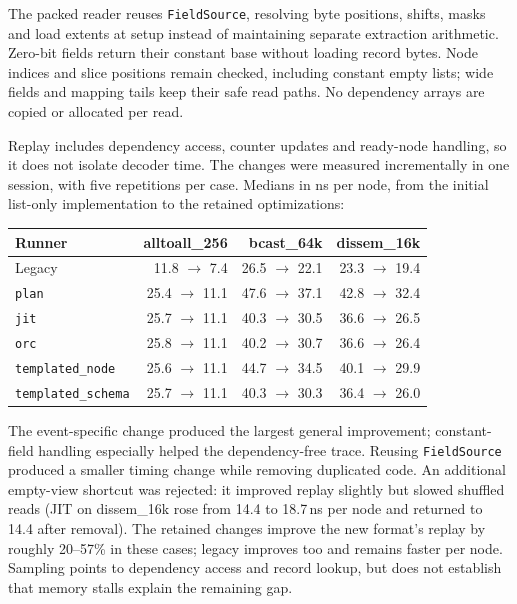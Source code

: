 \documentclass[10pt,a4paper]{article}
\begin{document}
The packed reader reuses \texttt{FieldSource}, resolving byte positions, shifts, masks and load extents at setup instead of maintaining separate extraction arithmetic. Zero-bit fields return their constant base without loading record bytes. Node indices and slice positions remain checked, including constant empty lists; wide fields and mapping tails keep their safe read paths. No dependency arrays are copied or allocated per read.

Replay includes dependency access, counter updates and ready-node handling, so it does not isolate decoder time. The changes were measured incrementally in one session, with five repetitions per case. Medians in ns per node, from the initial list-only implementation to the retained optimizations:

\begin{center}
\small
\begin{tabular}{lrrr}
\toprule
\textbf{Runner} & \textbf{alltoall\_256} & \textbf{bcast\_64k} & \textbf{dissem\_16k} \\
\midrule
Legacy & 11.8 \(\rightarrow\) 7.4 & 26.5 \(\rightarrow\) 22.1 & 23.3 \(\rightarrow\) 19.4 \\
\texttt{plan} & 25.4 \(\rightarrow\) 11.1 & 47.6 \(\rightarrow\) 37.1 & 42.8 \(\rightarrow\) 32.4 \\
\texttt{jit} & 25.7 \(\rightarrow\) 11.1 & 40.3 \(\rightarrow\) 30.5 & 36.6 \(\rightarrow\) 26.5 \\
\texttt{orc} & 25.8 \(\rightarrow\) 11.1 & 40.2 \(\rightarrow\) 30.7 & 36.6 \(\rightarrow\) 26.4 \\
\texttt{templated\_node} & 25.6 \(\rightarrow\) 11.1 & 44.7 \(\rightarrow\) 34.5 & 40.1 \(\rightarrow\) 29.9 \\
\texttt{templated\_schema} & 25.7 \(\rightarrow\) 11.1 & 40.3 \(\rightarrow\) 30.3 & 36.4 \(\rightarrow\) 26.0 \\
\bottomrule
\end{tabular}
\end{center}

The event-specific change produced the largest general improvement; constant-field handling especially helped the dependency-free trace. Reusing \texttt{FieldSource} produced a smaller timing change while removing duplicated code. An additional empty-view shortcut was rejected: it improved replay slightly but slowed shuffled reads (JIT on dissem\_16k rose from 14.4 to 18.7\,ns per node and returned to 14.4 after removal). The retained changes improve the new format's replay by roughly 20--57\% in these cases; legacy improves too and remains faster per node. Sampling points to dependency access and record lookup, but does not establish that memory stalls explain the remaining gap.
\end{document}
